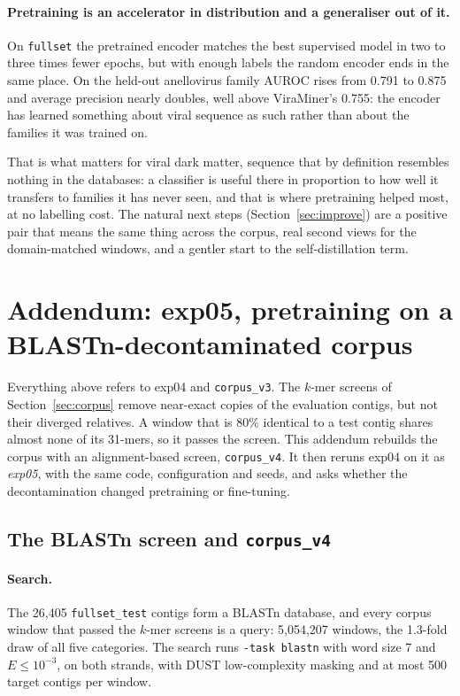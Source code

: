 \documentclass[10pt,twocolumn,a4paper]{article}
\begin{document}
\paragraph{Pretraining is an accelerator in distribution and a generaliser out of it.}
On \texttt{fullset} the pretrained encoder matches the best supervised model in
two to three times fewer epochs, but with enough labels the random encoder ends
in the same place. On the held-out anellovirus family AUROC rises from 0.791 to
0.875 and average precision nearly doubles, well above ViraMiner's 0.755: the
encoder has learned something about viral sequence as such rather than about the
families it was trained on.

That is what matters for viral dark matter, sequence that by definition
resembles nothing in the databases: a classifier is useful there in proportion
to how well it transfers to families it has never seen, and that is where
pretraining helped most, at no labelling cost. The natural next steps
(Section~\ref{sec:improve}) are a positive pair that means the same thing across
the corpus, real second views for the domain-matched windows, and a gentler start
to the self-distillation term.

\section{Addendum: exp05, pretraining on a BLASTn-decontaminated corpus}\label{sec:exp05}

Everything above refers to exp04 and \texttt{corpus\_v3}. The $k$-mer screens of
Section~\ref{sec:corpus} remove near-exact copies of the evaluation contigs, but
not their diverged relatives. A window that is 80\% identical to a test contig
shares almost none of its 31-mers, so it passes the screen. This addendum rebuilds
the corpus with an alignment-based screen, \texttt{corpus\_v4}. It then reruns
exp04 on it as \emph{exp05}, with the same code, configuration and seeds, and asks
whether the decontamination changed pretraining or fine-tuning.

\subsection{The BLASTn screen and \texttt{corpus\_v4}}\label{sec:exp05:blast}

\paragraph{Search.} The 26{,}405 \texttt{fullset\_test} contigs form a BLASTn
database, and every corpus window that passed the $k$-mer screens is a query:
5{,}054{,}207 windows, the 1.3-fold draw of all five categories. The search runs
\texttt{-task blastn} with word size 7 and $E \le 10^{-3}$, on both strands, with
DUST low-complexity masking and at most 500 target contigs per window.
\end{document}

